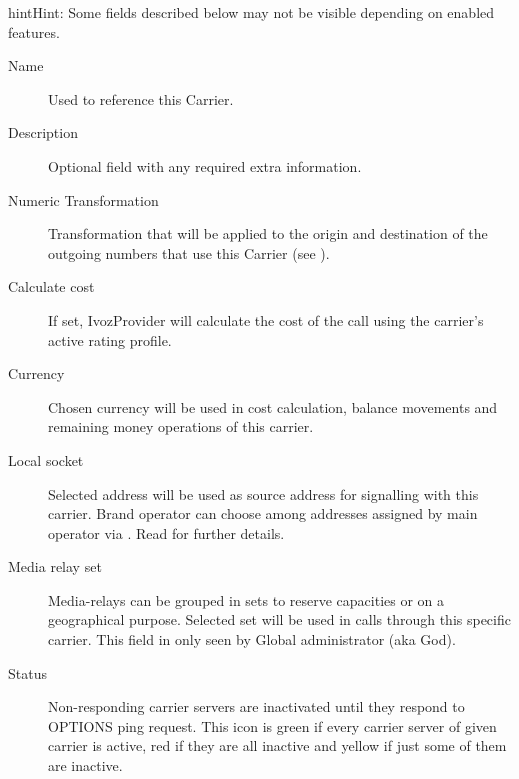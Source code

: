 \documentclass[letterpaper,10pt,english]{sphinxmanual}
\begin{document}
\begin{notice}{hint}{Hint:}
Some fields described below may not be visible depending on enabled features.
\begin{description}
\item[{Name}] \leavevmode
Used to reference this Carrier.

\item[{Description}] \leavevmode
Optional field with any required extra information.

\item[{Numeric Transformation}] \leavevmode
Transformation that will be applied to the origin and destination of the
outgoing numbers that use this Carrier
(see {\hyperref[administration_portal/brand/settings/numeric_transformations:numeric\string-transformations]{}}).

\item[{Calculate cost}] \leavevmode
If set, IvozProvider will calculate the cost of the call using the carrier's active rating profile.

\item[{Currency}] \leavevmode
Chosen currency will be used in cost calculation, balance movements and
remaining money operations of this carrier.

\item[{Local socket}] \leavevmode
Selected address will be used as source address for signalling with this carrier. Brand operator can choose among
addresses assigned by main operator via {\hyperref[administration_portal/platform/brands:brands]{}}. Read {\hyperref[administration_portal/platform/infrastructure/proxy_trunks:proxy\string-trunks]{}} for further details.

\item[{Media relay set}] \leavevmode
Media-relays can be grouped in sets to reserve capacities or on a geographical purpose. Selected set will be used
in calls through this specific carrier. This field in only seen by Global administrator (aka God).

\item[{Status}] \leavevmode
Non-responding carrier servers are inactivated until they respond to OPTIONS ping request. This icon is green if
every carrier server of given carrier is active, red if they are all inactive and yellow if just some of them are inactive.

\end{description}
\end{notice}
\end{document}
